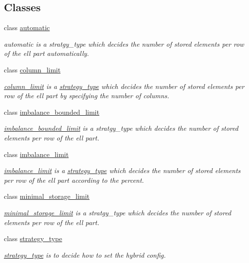 \subsection*{Classes}
\begin{DoxyCompactItemize}
\item 
class \hyperlink{classgko_1_1matrix_1_1Hybrid_1_1automatic}{automatic}
\begin{DoxyCompactList}\small\item\em automatic is a stratgy\+\_\+type which decides the number of stored elements per row of the ell part automatically. \end{DoxyCompactList}\item 
class \hyperlink{classgko_1_1matrix_1_1Hybrid_1_1column__limit}{column\+\_\+limit}
\begin{DoxyCompactList}\small\item\em \hyperlink{classgko_1_1matrix_1_1Hybrid_1_1column__limit}{column\+\_\+limit} is a \hyperlink{classgko_1_1matrix_1_1Hybrid_1_1strategy__type}{strategy\+\_\+type} which decides the number of stored elements per row of the ell part by specifying the number of columns. \end{DoxyCompactList}\item 
class \hyperlink{classgko_1_1matrix_1_1Hybrid_1_1imbalance__bounded__limit}{imbalance\+\_\+bounded\+\_\+limit}
\begin{DoxyCompactList}\small\item\em \hyperlink{classgko_1_1matrix_1_1Hybrid_1_1imbalance__bounded__limit}{imbalance\+\_\+bounded\+\_\+limit} is a stratgy\+\_\+type which decides the number of stored elements per row of the ell part. \end{DoxyCompactList}\item 
class \hyperlink{classgko_1_1matrix_1_1Hybrid_1_1imbalance__limit}{imbalance\+\_\+limit}
\begin{DoxyCompactList}\small\item\em \hyperlink{classgko_1_1matrix_1_1Hybrid_1_1imbalance__limit}{imbalance\+\_\+limit} is a \hyperlink{classgko_1_1matrix_1_1Hybrid_1_1strategy__type}{strategy\+\_\+type} which decides the number of stored elements per row of the ell part according to the percent. \end{DoxyCompactList}\item 
class \hyperlink{classgko_1_1matrix_1_1Hybrid_1_1minimal__storage__limit}{minimal\+\_\+storage\+\_\+limit}
\begin{DoxyCompactList}\small\item\em \hyperlink{classgko_1_1matrix_1_1Hybrid_1_1minimal__storage__limit}{minimal\+\_\+storage\+\_\+limit} is a stratgy\+\_\+type which decides the number of stored elements per row of the ell part. \end{DoxyCompactList}\item 
class \hyperlink{classgko_1_1matrix_1_1Hybrid_1_1strategy__type}{strategy\+\_\+type}
\begin{DoxyCompactList}\small\item\em \hyperlink{classgko_1_1matrix_1_1Hybrid_1_1strategy__type}{strategy\+\_\+type} is to decide how to set the hybrid config. \end{DoxyCompactList}\end{DoxyCompactItemize}
